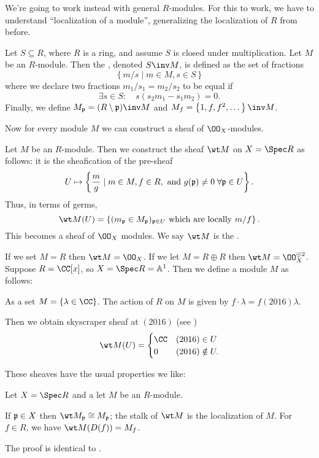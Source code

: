 \documentclass[11pt]{scrreprt}
\begin{document}
We're going to work instead with general $R$-modules.
For this to work, we have to understand ``localization of a module'',
generalizing the localization of $R$ from before.
\begin{definition}
	Let $S \subseteq R$, where $R$ is a ring,
	and assume $S$ is closed under multiplication.
	Let $M$ be an $R$-module.
	Then the , denoted $S\inv M$,
	is defined as the set of fractions
	\[ \left\{ m/s \mid m \in M, s \in S \right\} \]
	where we declare two fractions $m_1 / s_1 = m_2 / s_2$ 
	to be equal if 
	\[ \exists s \in S : \quad s(s_2m_1 - s_1m_2) = 0. \]
	Finally, we define $M_\pp = (R\setminus\pp)\inv M$
	and $M_f = \left\{ 1, f, f^2, \dots \right\}\inv M$.
\end{definition}
Now for every module $M$ we can construct a sheaf of $\OO_X$-modules.
\begin{definition}
	Let $M$ be an $R$-module.
	Then we construct the sheaf $\wt M$ on $X = \Spec R$ as follows:
	it is the sheafication of the pre-sheaf
	\[ U \mapsto 
		\left\{ \frac{m}{g} \mid m \in M, f \in R,
			\text{ and }
			g(\mathfrak p) \neq 0 \;\forall \mathfrak p \in U \right\}.
	\]
	Thus, in terms of germs,
	\[
		\wt M(U)
		= \left\{ (m_\pp \in M_\pp)_{\pp \in U} \text{ which are locally $m/f$} \right\}.
	\]
	This becomes a sheaf of $\OO_X$ modules.
	We say $\wt M$ is the .
\end{definition}
\begin{example}
	\listhack
	\begin{enumerate}[(a)]
		\ii If we set $M = R$ then $\wt M = \OO_X$.
		\ii If we let $M = R \oplus R$ then $\wt M = \OO_X^{\oplus 2}$.
		\ii Suppose $R = \CC[x]$, so $X = \Spec R = \Aff^1$.
		Then we define a module $M$ as follows:
		\begin{itemize}
			\ii As a set $M = \{ \lambda \in \CC \}$.
			\ii The action of $R$ on $M$ is
			given by $f \cdot \lambda = f(2016)\lambda$.
		\end{itemize}
		Then we obtain skyscraper sheaf at $(2016)$ (see )
		\[ 
			\wt M(U) 
			=
			\begin{cases}
				\CC & (2016) \in U \\
				0 & (2016) \notin U.
			\end{cases}
		\]
	\end{enumerate}
\end{example}
These sheaves have the usual properties we like:
\begin{theorem}
	Let $X = \Spec R$ and a let $M$ be an $R$-module.
	\begin{enumerate}[(a)]
		\ii If $\mathfrak p \in X$ then $\wt M_\pp \cong M_\pp$;
		the stalk of $\wt M$ is the localization of $M$.
		\ii For $f \in R$, we have $\wt M(D(f)) = M_f$.
	\end{enumerate}
\end{theorem}
The proof is identical to .
\end{document}
